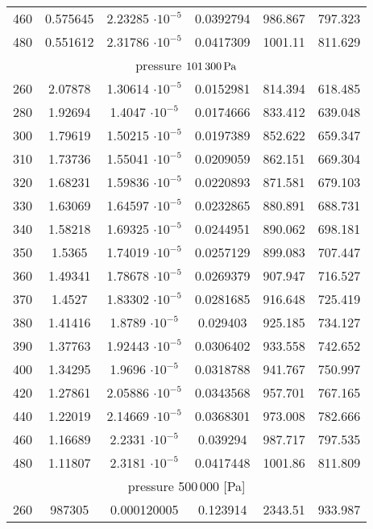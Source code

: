 \begin{table}
\begin{center}
\begin{tabular}{cccccc}
460			& 0.575645	& 2.23285 $ \cdot 10^{-5}$	& 0.0392794				& 986.867					& 797.323\\
480			& 0.551612	& 2.31786 $ \cdot 10^{-5}$	& 0.0417309				& 1001.11					& 811.629\\
\cmidrule{1-6}
\multicolumn{6}{c}{pressure $\unit[101\,300]{Pa}$}\\
260			& 2.07878	& 1.30614 $ \cdot 10^{-5}$	& 0.0152981				& 814.394					& 618.485	\\
280			& 1.92694	& 1.4047 $ \cdot 10^{-5}$	& 0.0174666				& 833.412					& 639.048	\\
300			& 1.79619	& 1.50215 $ \cdot 10^{-5}$	& 0.0197389				& 852.622					& 659.347	\\
310			& 1.73736	& 1.55041 $ \cdot 10^{-5}$	& 0.0209059				& 862.151					& 669.304	\\	
320			& 1.68231	& 1.59836 $ \cdot 10^{-5}$	& 0.0220893				& 871.581					& 679.103	\\
330			& 1.63069	& 1.64597 $ \cdot 10^{-5}$	& 0.0232865				& 880.891					& 688.731	\\
340			& 1.58218	& 1.69325 $ \cdot 10^{-5}$	& 0.0244951				& 890.062					& 698.181	\\
350			& 1.5365	& 1.74019 $ \cdot 10^{-5}$	& 0.0257129				& 899.083					& 707.447	\\
360			& 1.49341	& 1.78678 $ \cdot 10^{-5}$	& 0.0269379				& 907.947					& 716.527	\\
370			& 1.4527	& 1.83302 $ \cdot 10^{-5}$	& 0.0281685				& 916.648					& 725.419	\\
380			& 1.41416	& 1.8789 $ \cdot 10^{-5}$	& 0.029403				& 925.185					& 734.127	\\
390			& 1.37763	& 1.92443 $ \cdot 10^{-5}$	& 0.0306402				& 933.558					& 742.652	\\
400			& 1.34295	& 1.9696 $ \cdot 10^{-5}$	& 0.0318788				& 941.767					& 750.997	\\
420			& 1.27861	& 2.05886 $ \cdot 10^{-5}$	& 0.0343568				& 957.701					& 767.165	\\
440			& 1.22019	& 2.14669 $ \cdot 10^{-5}$	& 0.0368301				& 973.008					& 782.666	\\
460			& 1.16689	& 2.2331 $ \cdot 10^{-5}$	& 0.039294				& 987.717					& 797.535	\\
480			& 1.11807	& 2.3181 $ \cdot 10^{-5}$	& 0.0417448				& 1001.86					& 811.809	\\
\cmidrule{1-6}
\multicolumn{6}{c}{pressure 500\,000 [Pa]}\\
260	&	987305	&	0.000120005	&	0.123914	&	2343.51	&	933.987	\\

\end{tabular}
\end{center}
\end{table}
